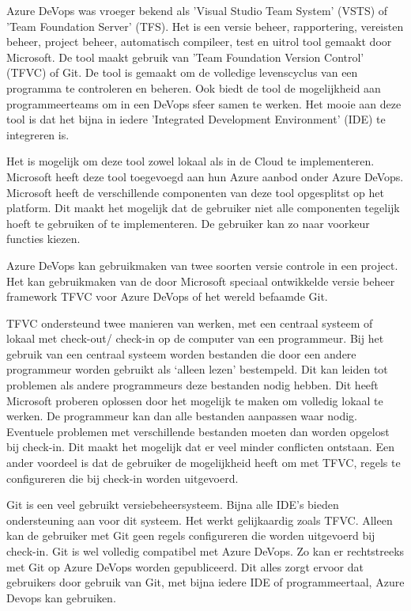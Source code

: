 Azure DeVops was vroeger bekend als 'Visual Studio Team System' (VSTS) of 'Team Foundation Server' (TFS). Het is een versie beheer, rapportering, vereisten beheer, project beheer, automatisch compileer, test en uitrol tool gemaakt door Microsoft. De tool maakt gebruik van 'Team Foundation Version Control' (TFVC) of Git. De tool is gemaakt om de volledige levenscyclus van een programma te controleren en beheren. Ook biedt de tool de mogelijkheid aan programmeerteams om in een DeVops sfeer samen te werken. Het mooie aan deze tool is dat het bijna in iedere 'Integrated Development Environment' (IDE) te integreren is.

Het is mogelijk om deze tool zowel lokaal als in de Cloud te implementeren. Microsoft heeft deze tool toegevoegd aan hun Azure aanbod onder Azure DeVops. Microsoft heeft de verschillende componenten van deze tool opgesplitst op het platform. Dit maakt het mogelijk dat de gebruiker niet alle componenten tegelijk hoeft te gebruiken of te implementeren. De gebruiker kan zo naar  voorkeur functies kiezen.

Azure DeVops kan gebruikmaken van twee soorten versie controle in een project. Het kan gebruikmaken van de door Microsoft speciaal ontwikkelde versie beheer framework TFVC voor Azure DeVops of het wereld befaamde Git. 

TFVC ondersteund twee manieren van werken, met een centraal systeem of lokaal met check-out/ check-in op de computer van een programmeur. Bij het gebruik van een centraal systeem worden bestanden die door een andere programmeur worden gebruikt als ‘alleen lezen’ bestempeld. Dit kan leiden tot problemen als andere programmeurs deze bestanden nodig hebben. Dit heeft Microsoft proberen oplossen door het mogelijk te maken om volledig lokaal te werken. De programmeur kan dan alle bestanden aanpassen waar nodig. Eventuele problemen met verschillende bestanden moeten dan worden opgelost bij check-in. Dit maakt het mogelijk dat er veel minder conflicten ontstaan. Een ander voordeel is dat de gebruiker de mogelijkheid heeft om met TFVC, regels te configureren die bij check-in worden uitgevoerd.

Git is een veel gebruikt versiebeheersysteem. Bijna alle IDE’s bieden ondersteuning aan voor dit systeem. Het werkt gelijkaardig zoals TFVC. Alleen kan de gebruiker met Git geen regels configureren die worden uitgevoerd bij check-in. Git is wel volledig compatibel met Azure DeVops. Zo kan er rechtstreeks met Git op Azure DeVops worden gepubliceerd. Dit alles zorgt ervoor dat gebruikers door gebruik van Git, met bijna iedere IDE of programmeertaal, Azure Devops kan gebruiken. 

